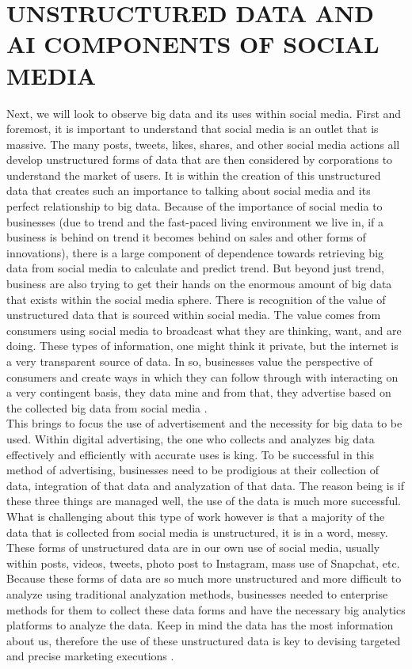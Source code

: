 \documentclass[sigconf]{acmart}
\begin{document}
\section{UNSTRUCTURED DATA AND AI COMPONENTS OF SOCIAL MEDIA}

Next, we will look to observe big data and its uses within social media. First and foremost, it is important to understand that social media is an outlet that is massive. The many posts, tweets, likes, shares, and other social media actions all develop unstructured forms of data that are then considered by corporations to understand the market of users. It is within the creation of this unstructured data that creates such an importance to talking about social media and its perfect relationship to big data. Because of the importance of social media to businesses (due to trend and the fast-paced living environment we live in, if a business is behind on trend it becomes behind on sales and other forms of innovations), there is a large component of dependence towards retrieving big data from social media to calculate and predict trend. But beyond just trend, business are also trying to get their hands on the enormous amount of big data that exists within the social media sphere. There is recognition of the value of unstructured data that is sourced within social media. The value comes from consumers using social media to broadcast what they are thinking, want, and are doing. These types of information, one might think it private, but the internet is a very transparent source of data. In so, businesses value the perspective of consumers and create ways in which they can follow through with interacting on a very contingent basis, they data mine and from that, they advertise based on the collected big data from social media \cite{6}.\\

This brings to focus the use of advertisement and the necessity for big data to be used. Within digital advertising, the one who collects and analyzes big data effectively and efficiently with accurate uses is king. To be successful in this method of advertising, businesses need to be prodigious at their collection of data, integration of that data and analyzation of that data. The reason being is if these three things are managed well, the use of the data is much more successful. What is challenging about this type of work however is that a majority of the data that is collected from social media is unstructured, it is in a word, messy. These forms of unstructured data are in our own use of social media, usually within posts, videos, tweets, photo post to Instagram, mass use of Snapchat, etc. Because these forms of data are so much more unstructured and more difficult to analyze using traditional analyzation methods, businesses needed to enterprise methods for them to collect these data forms and have the necessary big analytics platforms to analyze the data. Keep in mind the data has the most information about us, therefore the use of these unstructured data is key to devising targeted and precise marketing executions \cite{7}. \\
\end{document}
